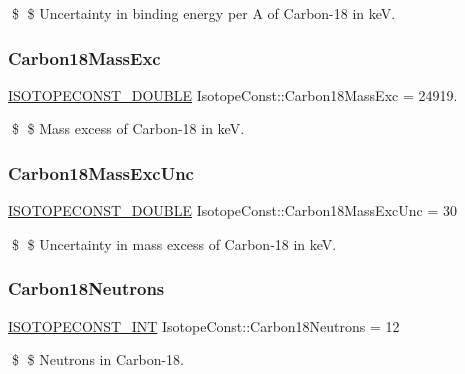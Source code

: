 \$ \$ Uncertainty in binding energy per A of Carbon-\/18 in keV. \mbox{\label{group___isotope_const-_carbon-_c18_ga7ea7cda1dcbb60278fc3dffa5edd1b77}} 
\subsubsection{\texorpdfstring{Carbon18\+Mass\+Exc}{Carbon18MassExc}}
{\footnotesize\ttfamily \mbox{\hyperlink{group___isotope_const-_macros_ga8f45a7272ce02c0b4c65c44636ed719a}{I\+S\+O\+T\+O\+P\+E\+C\+O\+N\+S\+T\+\_\+\+D\+O\+U\+B\+LE}} Isotope\+Const\+::\+Carbon18\+Mass\+Exc = 24919.}

\$ \$ Mass excess of Carbon-\/18 in keV. \mbox{\label{group___isotope_const-_carbon-_c18_ga8b13a46baad00c90bce342eebc97c3de}} 
\subsubsection{\texorpdfstring{Carbon18\+Mass\+Exc\+Unc}{Carbon18MassExcUnc}}
{\footnotesize\ttfamily \mbox{\hyperlink{group___isotope_const-_macros_ga8f45a7272ce02c0b4c65c44636ed719a}{I\+S\+O\+T\+O\+P\+E\+C\+O\+N\+S\+T\+\_\+\+D\+O\+U\+B\+LE}} Isotope\+Const\+::\+Carbon18\+Mass\+Exc\+Unc = 30}

\$ \$ Uncertainty in mass excess of Carbon-\/18 in keV. \mbox{\label{group___isotope_const-_carbon-_c18_ga49db68de5e047d300079058251056d16}} 
\subsubsection{\texorpdfstring{Carbon18\+Neutrons}{Carbon18Neutrons}}
{\footnotesize\ttfamily \mbox{\hyperlink{group___isotope_const-_macros_ga5f18360b3e99483a35c32d789e62621c}{I\+S\+O\+T\+O\+P\+E\+C\+O\+N\+S\+T\+\_\+\+I\+NT}} Isotope\+Const\+::\+Carbon18\+Neutrons = 12}

\$ \$ Neutrons in Carbon-\/18. \mbox{\label{group___isotope_const-_carbon-_c18_ga6cc10e53c8da9e78dc0beb65dce0644b}} 
